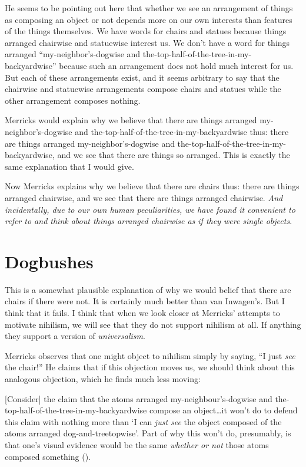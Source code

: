 \documentclass[11pt]{article}
\newenvironment{squote}{%
\begin{spacing}{1}
       	\begin{list}{}{%
\setlength{\labelwidth}{0pt}%
\rightmargin\leftmargin%
}
\item\relax
}{%
\end{list}%
\end{spacing}
}
\begin{document}
\begin{spacing}{1.25}
He seems to be pointing out here that whether we see an arrangement of
things as composing an object or not depends more on our own interests
than features of the things themselves.  We have words for chairs and
statues because things arranged chairwise and statuewise interest us.
We don't have a word for things arranged ``my-neighbor's-dogwise and
the-top-half-of-the-tree-in-my-backyardwise'' because such an
arrangement does not hold much interest for us.  But each of these
arrangements exist, and it seems arbitrary to say that the chairwise
and statuewise arrangements compose chairs and statues while the other
arrangement composes nothing.

Merricks would explain why we believe that there are things arranged
my-neighbor's-dogwise and the-top-half-of-the-tree-in-my-backyardwise
thus: there are things arranged my-neighbor's-dogwise and
the-top-half-of-the-tree-in-my-backyardwise, and we see that there are
things so arranged.  This is exactly the same explanation that I would
give.

Now Merricks explains why we believe that there are chairs thus: there
are things arranged chairwise, and we see that there are things
arranged chairwise.  {\em And incidentally, due to our own human
  peculiarities, we have found it convenient to refer to and think
  about things arranged chairwise as if they were single objects}.

\section{Dogbushes}
\label{dogbush}
This is a somewhat plausible explanation of why we would belief that
there are chairs if there were not.  It is certainly much better than
van Inwagen's.  But I think that it fails.  I think that when we look
closer at Merricks' attempts to motivate nihilism, we will see that
they do not support nihilism at all.  If anything they support a
version of {\em universalism}.

Merricks observes that one might object to nihilism simply by saying,
``I just {\em see} the chair!''  He claims that if this objection
moves us, we should think about this analogous objection, which he
finds much less moving:

\begin{squote}
{[}Consider{]} the claim that the atoms arranged my-neighbour's-dogwise
and the-top-half-of-the-tree-in-my-backyardwise compose an
object\ldots{}it won't do to defend this claim with nothing more than `I
can \emph{just see} the object composed of the atoms arranged
dog-and-treetopwise'. Part of why this won't do, presumably, is that
one's visual evidence would be the same \emph{whether or not} those
atoms composed something (\citeyear[8--9]{merricks2001a}).
\end{squote}


\end{spacing}
\end{document}
